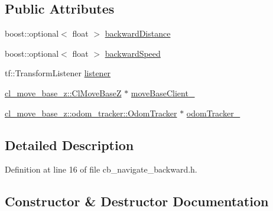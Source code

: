 \subsection*{Public Attributes}
\begin{DoxyCompactItemize}
\item 
boost\+::optional$<$ float $>$ \hyperlink{classcl__move__base__z_1_1CbNavigateBackwards_abb7099e4e18602f6cf06c4f5534a2a15}{backward\+Distance}
\item 
boost\+::optional$<$ float $>$ \hyperlink{classcl__move__base__z_1_1CbNavigateBackwards_aafadf3a154d4f805e63094a46a891764}{backward\+Speed}
\item 
tf\+::\+Transform\+Listener \hyperlink{classcl__move__base__z_1_1CbNavigateBackwards_a86be71ac1dd72f318875bee13259f3da}{listener}
\item 
\hyperlink{classcl__move__base__z_1_1ClMoveBaseZ}{cl\+\_\+move\+\_\+base\+\_\+z\+::\+Cl\+Move\+BaseZ} $\ast$ \hyperlink{classcl__move__base__z_1_1CbNavigateBackwards_a943c1a790eac9266adf11fbdc078f03a}{move\+Base\+Client\+\_\+}
\item 
\hyperlink{classcl__move__base__z_1_1odom__tracker_1_1OdomTracker}{cl\+\_\+move\+\_\+base\+\_\+z\+::odom\+\_\+tracker\+::\+Odom\+Tracker} $\ast$ \hyperlink{classcl__move__base__z_1_1CbNavigateBackwards_a75a8ae7aef6c72e96f4037c4941b0341}{odom\+Tracker\+\_\+}
\end{DoxyCompactItemize}


\subsection{Detailed Description}


Definition at line 16 of file cb\+\_\+navigate\+\_\+backward.\+h.



\subsection{Constructor \& Destructor Documentation}
\mbox{\label{classcl__move__base__z_1_1CbNavigateBackwards_aed93fbbdf28501d068ca4acb6a225d27}} 

